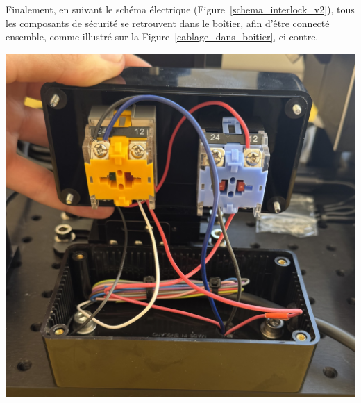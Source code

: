 \begin{minipage}[c]{0.48\textwidth}
    Finalement, en suivant le schéma électrique (Figure~\ref{schema_interlock_v2}), tous les composants de sécurité se retrouvent dans le boîtier, afin d'être connecté ensemble, comme illustré sur la Figure~\ref{cablage_dans_boitier}, ci-contre.
\end{minipage}\hfill
\begin{minipage}[c]{0.48\textwidth}
    \begin{center}
        \includegraphics[width=\textwidth]{assets/figures/Protections_laser/Securite_electrique/cablage_dans_boitier.jpeg}
    \end{center}
    \label{cablage_dans_boitier}
\end{minipage}